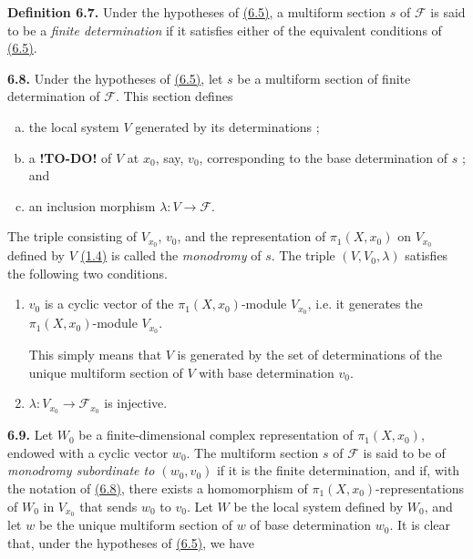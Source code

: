 \documentclass{report}
\newenvironment{rmenv}[1]
  {\phantomsection\par\medskip\noindent\textbf{#1.}\rmfamily}
  {\par\medskip}
\newcommand{\scr}[1]{{\mathscr{#1}}}
\newcommand{\todo}{\textbf{ !TO-DO! }}
\newcommand{\oldpage}[1]{\marginpar{\footnotesize$\Big\vert$ \textit{p.~#1}}}
\begin{document}
\begin{rmenv}{Definition 6.7}
\label{I.6.7}
  Under the hypotheses of \hyperref[I.6.5]{(6.5)}, a multiform section $s$ of $\scr{F}$ is said to be a \emph{finite determination} if it satisfies either of the equivalent conditions of \hyperref[I.6.5]{(6.5)}.
\end{rmenv}

\begin{rmenv}{6.8}
\label{I.6.8}
  Under the hypotheses of \hyperref[I.6.5]{(6.5)}, let $s$ be a multiform section of finite determination of $\scr{F}$.
  This section defines
\oldpage{39}
  \begin{enumerate}[a)]
    \item the local system $V$ generated by its determinations ;
    \item a \todo of $V$ at $x_0$, say, $v_0$, corresponding to the base determination of $s$ ; and
    \item an inclusion morphism $\lambda\colon V\to\scr{F}$.
  \end{enumerate}

  The triple consisting of $V_{x_0}$, $v_0$, and the representation of $\pi_1(X,x_0)$ on $V_{x_0}$ defined by $V$ \hyperref[I.1.4]{(1.4)} is called the \emph{monodromy} of $s$.
  The triple $(V,V_0,\lambda)$ satisfies the following two conditions.
  \begin{enumerate}
    \item[(6.8.1)]\label{I.6.8.1}
      $v_0$ is a cyclic vector of the $\pi_1(X,x_0)$-module $V_{x_0}$, i.e. it generates the $\pi_1(X,x_0)$-module $V_{x_0}$.

      This simply means that $V$ is generated by the set of determinations of the unique multiform section of $V$ with base determination $v_0$.
    \item[(6.8.2)]\label{I.6.8.2}
      $\lambda\colon V_{x_0}\to\scr{F}_{x_0}$ is injective.
  \end{enumerate}
\end{rmenv}

\begin{rmenv}{6.9}
\label{I.6.9}
  Let $W_0$ be a finite-dimensional complex representation of $\pi_1(X,x_0)$, endowed with a cyclic vector $w_0$.
  The multiform section $s$ of $\scr{F}$ is said to be of \emph{monodromy subordinate to $(w_0,v_0)$} if it is the finite determination, and if, with the notation of \hyperref[I.6.8]{(6.8)}, there exists a homomorphism of $\pi_1(X,x_0)$-representations of $W_0$ in $V_{x_0}$ that sends $w_0$ to $v_0$.
  Let $W$ be the local system defined by $W_0$, and let $w$ be the unique multiform section of $w$ of base determination $w_0$.
  It is clear that, under the hypotheses of \hyperref[I.6.5]{(6.5)}, we have
\end{rmenv}
\end{document}
